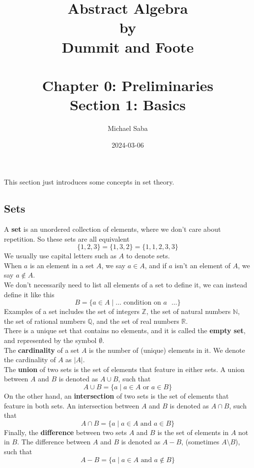 \documentclass[12pt]{article}
\title{%
    \Huge Abstract Algebra \\
    \large by \\
    \Large Dummit and Foote \\~\\
    \LARGE Chapter 0: Preliminaries \\
    \Large Section 1: Basics
}
\date{2024-03-06}
\author{Michael Saba}
\newcommand{\N}{\mathbb{N}}
\newcommand{\Z}{\mathbb{Z}}
\newcommand{\Q}{\mathbb{Q}}
\newcommand{\R}{\mathbb{R}}
\begin{document}
    \maketitle
    \newpage

    This section just introduces some concepts in set theory. \\

    \subsection*{Sets}

    A \textbf{set} is an unordered collection of elements,
    where we don't care about repetition.
    So these sets are all equivalent
    \[ \{1, 2, 3\} = \{ 1, 3, 2\} = \{ 1, 1, 2, 3, 3 \}  \]
    We usually use capital letters such as $A$ to denote sets. \\
    When $a$ is an element in a set $A$,
    we say $a \in A$, and if $a$ isn't an element of $A$,
    we say $a \notin A$. \\
    We don't necessarily need to list all elements of a set
    to define it, we can instead define it like this
    \[ B = \{ a \in A \mid \dots \text{ condition on $a$ } \dots \} \]
    Examples of a set includes the set of integers $\Z$,
    the set of natural numbers $\N$,
    the set of rational numbers $\Q$,
    and the set of real numbers $\R$. \\

    There is a unique set that contains no elements,
    and it is called the \textbf{empty set},
    and represented by the symbol $\emptyset$. \\
    
    The \textbf{cardinality} of a set $A$ is the number of (unique)
    elements in it.
    We denote the cardinality of $A$ as $|A|$. \\

    The \textbf{union} of two sets is the set of elements
    that feature in either sets.
    A union between $A$ and $B$ is denoted as $A \cup B$, such that
    \[ A \cup B = \{ a \mid a \in A \text{ or } a \in B \} \]
    On the other hand, an \textbf{intersection} of two sets is the set of
    elements that feature in both sets.
    An intersection between $A$ and $B$ is denoted as $A \cap B$, such that
    \[ A \cap B = \{ a \mid a \in A \text{ and } a \in B \} \]
    Finally, the \textbf{difference} between two sets $A$ and $B$
    is the set of elements in $A$ not in $B$.
    The difference between $A$ and $B$ is denoted as $A - B$,
    (sometimes $A \setminus B$), such that
    \[ A - B = \{ a \mid a \in A \text{ and } a \notin B \} \]
    \\
\end{document}
